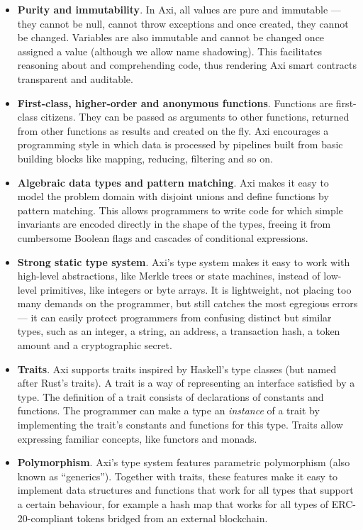 \begin{itemize}
  \item \textbf{Purity and immutability}. In Axi, all values are pure and immutable --- they cannot be null, cannot throw exceptions and once created, they cannot be changed. Variables are also immutable and cannot be changed once assigned a value (although we allow name shadowing). This facilitates reasoning about and comprehending code, thus rendering Axi smart contracts transparent and auditable.
  \item \textbf{First-class, higher-order and anonymous functions}. Functions are first-class citizens. They can be passed as arguments to other functions, returned from other functions as results and created on the fly. Axi encourages a programming style in which data is processed by pipelines built from basic building blocks like mapping, reducing, filtering and so on.
  \item \textbf{Algebraic data types and pattern matching}. Axi makes it easy to model the problem domain with disjoint unions and define functions by pattern matching. This allows programmers to write code for which simple invariants are encoded directly in the shape of the types, freeing it from cumbersome Boolean flags and cascades of conditional expressions.
  \item \textbf{Strong static type system}. Axi's type system makes it easy to work with high-level abstractions, like Merkle trees or state machines, instead of low-level primitives, like integers or byte arrays. It is lightweight, not placing too many demands on the programmer, but still catches the most egregious errors --- it can easily protect programmers from confusing distinct but similar types, such as an integer, a string, an address, a transaction hash, a token amount and a cryptographic secret.
  \item \textbf{Traits}. Axi supports traits inspired by Haskell's type classes (but named after Rust's traits). A trait is a way of representing an interface satisfied by a type. The definition of a trait consists of declarations of constants and functions. The programmer can make a type an \textit{instance} of a trait by implementing the trait's constants and functions for this type. Traits allow expressing familiar concepts, like functors and monads.
  \item \textbf{Polymorphism}. Axi's type system features parametric polymorphism (also known as ``generics''). Together with traits, these features make it easy to implement data structures and functions that work for all types that support a certain behaviour, for example a hash map that works for all types of ERC-20-compliant tokens bridged from an external blockchain.
\end{itemize}

